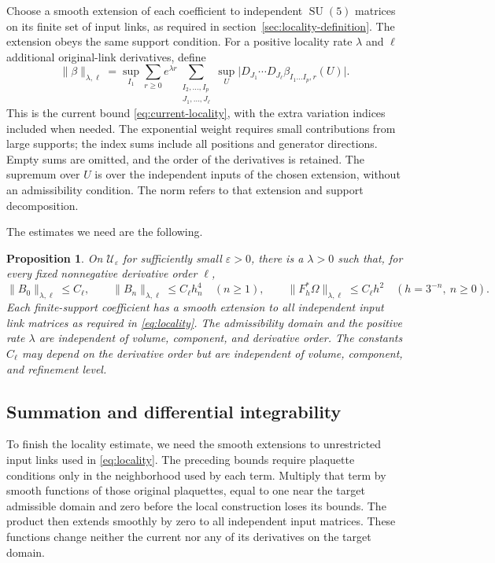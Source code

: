 \documentclass[11pt,a4paper]{article}
\newtheorem{proposition}[theorem]{Proposition}
\theoremstyle{remark}
\DeclareMathOperator{\SU}{SU}
\newcommand{\eps}{\varepsilon}
\begin{document}
Choose a smooth extension of each coefficient to independent $\SU(5)$
matrices on its finite set of input links, as required in
section~\ref{sec:locality-definition}. The extension obeys the same
support condition. For a positive locality rate
$\lambda$ and $\ell$ additional original-link derivatives, define
\begin{equation}
 \|\beta\|_{\lambda,\ell}
 =\sup_{I_1}\sum_{r\ge0}e^{\lambda r}
 \sum_{\substack{I_2,\ldots,I_p\\J_1,\ldots,J_\ell}}
 \sup_U\bigl|D_{J_1}\cdots D_{J_\ell}
              \beta_{I_1\ldots I_p,r}(U)\bigr|.
 \label{eq:locality}
\end{equation}
This is the current bound \eqref{eq:current-locality}, with the extra
variation indices included when needed. The exponential weight requires
small contributions from large supports; the index sums include all
positions and generator directions. Empty sums are omitted, and the
order of the derivatives is retained. The supremum over $U$ is over the
independent inputs of the chosen extension, without an admissibility
condition. The norm refers to that extension and support decomposition.

The estimates we need are the following.
\begin{proposition}
\label{prop:locality}
On $\mathcal U_\eps$ for sufficiently small $\eps>0$, there is a
$\lambda>0$ such that, for every fixed nonnegative derivative order
$\ell$,
\begin{equation}
 \|B_0\|_{\lambda,\ell}\le C_\ell,\qquad
 \|B_n\|_{\lambda,\ell}\le C_\ell h_n^4\quad(n\ge1),\qquad
 \|F_h^*\Omega\|_{\lambda,\ell}\le C_\ell h^2
       \quad(h=3^{-n},\ n\ge0).
 \label{eq:scale-bounds}
\end{equation}
Each finite-support coefficient has a smooth extension to all independent
input link matrices as required in \eqref{eq:locality}. The admissibility
domain and the positive rate $\lambda$ are independent of volume,
component, and derivative order. The constants $C_\ell$ may depend on
the derivative order but are independent of volume, component, and
refinement level.
\end{proposition}

\subsection{Summation and differential integrability}

To finish the locality estimate, we need the smooth extensions to
unrestricted input links used in \eqref{eq:locality}. The preceding
bounds require plaquette conditions only in the neighborhood used by
each term. Multiply that term by smooth functions of those original
plaquettes, equal to one near the target admissible domain and zero
before the local construction loses its bounds. The product then extends
smoothly by zero to all independent input matrices. These functions
change neither the current nor any of its derivatives on the target
domain.
\end{document}
